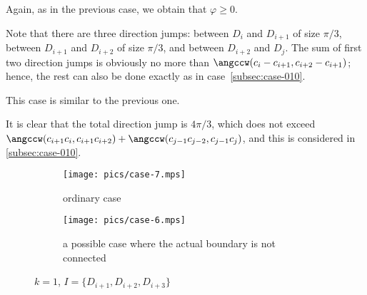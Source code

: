\begin{enumerate}[label={\bf Case \arabic*: }, wide, labelwidth=!, labelindent=0pt]

Again, as in the previous case, we obtain that $\varphi\geq 0$.

Note that there are three direction jumps: between $D_i$ and $D_{i+1}$ of size $\pi/3$, between $D_{i+1}$ and $D_{i+2}$ of size $\pi/3$, and between $D_{i+2}$ and $D_j$. The sum of first two direction jumps is obviously no more than $\angccw(c_i - c_{i+1}, c_{i+2} - c_{i+1})$; hence, the rest can also be done exactly as in case~\ref{subsec:case-010}.



This case is similar to the previous one.


It is clear that the total direction jump is $4\pi/3$, which does not exceed $\angccw(c_{i+1}c_i, c_{i+1}c_{i+2}) + \angccw(c_{j-1}c_{j-2}, c_{j-1}c_j)$, and this is considered in \ref{subsec:case-010}.

\begin{figure}[h!]
    \centering
    \begin{subfigure}{.45\textwidth}
    \texttt{[image: pics/case-7.mps]}
    \caption{ordinary case}
    \end{subfigure}
    \begin{subfigure}{.45\textwidth}
    \texttt{[image: pics/case-6.mps]}
    \caption{a possible case where the actual boundary is not connected}
    \end{subfigure}
    \caption{$k = 1$, $I = \{D_{i+1}, D_{i+2}, D_{i+3}\}$}
\end{figure}

\end{enumerate}

